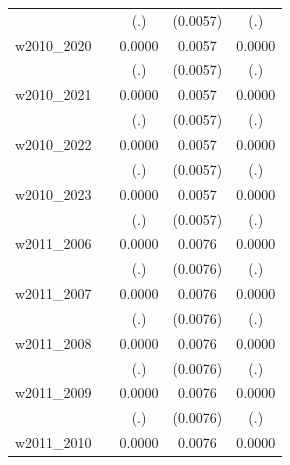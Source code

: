 \begin{table}[htbp]
\begin{tabular}{l*{4}{c}}
            &                     &         (.)         &    (0.0057)         &         (.)         \\
[1em]
w2010\_2020  &                     &      0.0000         &      0.0057         &      0.0000         \\
            &                     &         (.)         &    (0.0057)         &         (.)         \\
[1em]
w2010\_2021  &                     &      0.0000         &      0.0057         &      0.0000         \\
            &                     &         (.)         &    (0.0057)         &         (.)         \\
[1em]
w2010\_2022  &                     &      0.0000         &      0.0057         &      0.0000         \\
            &                     &         (.)         &    (0.0057)         &         (.)         \\
[1em]
w2010\_2023  &                     &      0.0000         &      0.0057         &      0.0000         \\
            &                     &         (.)         &    (0.0057)         &         (.)         \\
[1em]
w2011\_2006  &                     &      0.0000         &      0.0076         &      0.0000         \\
            &                     &         (.)         &    (0.0076)         &         (.)         \\
[1em]
w2011\_2007  &                     &      0.0000         &      0.0076         &      0.0000         \\
            &                     &         (.)         &    (0.0076)         &         (.)         \\
[1em]
w2011\_2008  &                     &      0.0000         &      0.0076         &      0.0000         \\
            &                     &         (.)         &    (0.0076)         &         (.)         \\
[1em]
w2011\_2009  &                     &      0.0000         &      0.0076         &      0.0000         \\
            &                     &         (.)         &    (0.0076)         &         (.)         \\
[1em]
w2011\_2010  &                     &      0.0000         &      0.0076         &      0.0000         \\

\end{tabular}
\end{table}

